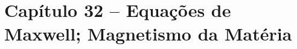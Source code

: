 \section{Capítulo 32 -- Equações de Maxwell; Magnetismo da Matéria}


\newpage

\newpage

\newpage

\newpage

\newpage
